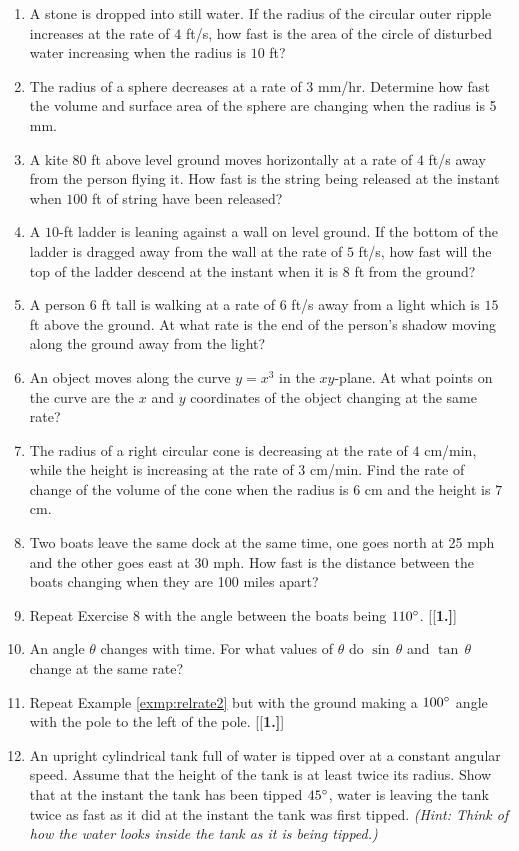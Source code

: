 \startexercises\label{sec3dot5}
{\small
{}
\begin{enumerate}[\bfseries 1.]
 \item A stone is dropped into still water. If the radius of the circular outer
  ripple increases at the rate of $4$ ft/s, how fast is the area of the circle
  of disturbed water increasing when the radius is $10$ ft?
 \item The radius of a sphere decreases at a rate of 3 mm/hr. Determine how fast
  the volume and surface area of the sphere are changing when the radius is 5 mm.
 \item A kite $80$ ft above level ground moves horizontally at a rate of
  $4$ ft/s away from the person flying it. How fast is the string being
  released at the instant when $100$ ft of string have been released?
 \item A $10$-ft ladder is leaning against a wall on level ground. If the
  bottom of the ladder is dragged away from the wall at the rate of $5$ ft/s,
  how fast will the top of the ladder descend at the instant when it is $8$ ft
  from the ground?
 \item A person $6$ ft tall is walking at a rate of $6$ ft/s away from a light
  which is $15$ ft above the ground. At what rate is the end of the person's
  shadow moving along the ground away from the light?
 \item An object moves along the curve $y = x^3$ in the $xy$-plane. At what
  points on the curve are the $x$ and $y$ coordinates of the object changing at
  the same rate?
 \item The radius of a right circular cone is decreasing at the rate of $4$
  cm/min, while the height is increasing at the rate of $3$ cm/min. Find the
  rate of change of the volume of the cone when the radius is $6$ cm and
  the height is $7$ cm.
 \item Two boats leave the same dock at the same time, one goes north at
  25 mph and the other goes east at 30 mph. How fast is the distance between
  the boats changing when they are 100 miles apart?
 \item Repeat Exercise 8 with the angle between the boats being $110^\circ$.
[{[\bfseries 1.]}]
 \item An angle $\theta$ changes with time. For what values of $\theta$
  do $\sin\,\theta$ and $\tan\,\theta$ change at the same rate?
 \item Repeat Example \ref{exmp:relrate2} but with the ground making a
  $100^\circ$ angle with the pole to the left of the pole.
[{[\bfseries 1.]}]
 \item An upright cylindrical tank full of water is tipped over at a
 constant angular speed. Assume that the height of the tank
 is at least twice its radius. Show that at the instant the tank has
 been tipped $45^\circ$, water is leaving the tank twice as fast as it did
 at the instant the tank was first tipped.
 \emph{(Hint: Think of how the water looks inside the tank as it is being tipped.)}
\end{enumerate}
}
\newpage
